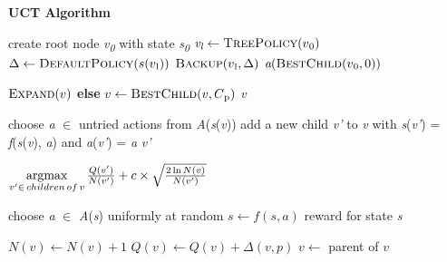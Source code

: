 \begin{algorithm}
  \caption[UCT Algorithm]{\textbf{UCT Algorithm}}\label{UCTalgorithm}
  \begin{algorithmic}
    \State create root node \textit{v\textsubscript{0}} with state \textit{s\textsubscript{0}}
        \State $\textit{v\textsubscript{l}}\gets \Call{TreePolicy}{v\textsubscript{0}}$
        \State $\Delta\gets \Call{DefaultPolicy}{s(v\textsubscript{l}})$
        \State $\Call{Backup}{v\textsubscript{l}, \Delta}$
    \EndWhile
    \State \Return $\textit{a}(\Call{BestChild}{v\textsubscript{0}, 0})$
    \EndFunction
    
        \State \Return $\Call{Expand}{v}$
        \EndIf
        \State \textbf{else}
        \State \hspace{\algorithmicindent}$v\gets \Call{BestChild}{v, C\textsubscript{p}}$
    \EndWhile
    \State \Return $v$
    \EndFunction
    
    \State choose \textit{a} $\in$ untried actions from \textit{A}(\textit{s}(\textit{v}))
    \State add a new child \textit{v'} to \textit{v}
    \State \hspace{\algorithmicindent} with \textit{s}(\textit{v'}) = \textit{f}(\textit{s}(\textit{v}), \textit{a})
    \State \hspace{\algorithmicindent} and \textit{a}(\textit{v'}) = \textit{a}
    \State \Return \textit{v'}
    \EndFunction
    
    \State \Return $\operatorname*{argmax}\limits_{v' \in \,children\,of\,v} \frac{Q(v')}{N(v')} + c \times \sqrt{\frac{2\ln{N(v)}}{N(v')}}$
    \EndFunction
    
        \State choose \textit{a} $\in$ \textit{A}(\textit{s}) uniformly at random
        \State $s\gets f(s, a)$
    \EndWhile
    \State \Return reward for state \textit{s}
    \EndFunction
    
        \State $N(v)\gets N(v) + 1$
        \State $Q(v)\gets Q(v) + \Delta(v, p)$
        \State $v\gets$ parent of $v$
    \EndWhile
    \EndFunction
  \end{algorithmic}
\end{algorithm}

